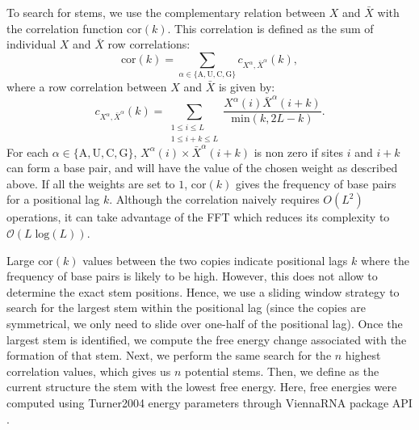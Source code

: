 To search for stems, we use the complementary relation between \(X\) and \(\bar{X}\) with the correlation function \(\text{cor}(k)\). This correlation is defined as the sum of individual \(X\) and \(\bar{X}\) row correlations:
\begin{equation}
\text{cor}(k)=\sum_{\alpha \in \{\text{A},\text{U},\text{C},\text{G}\}}c_{X^{\alpha},\bar{X}^{\alpha}}(k),
\end{equation}
where a row correlation between \(X\) and \(\bar{X}\) is given by:
\begin{equation}
c_{X^\alpha,\bar{X}^\alpha}(k) = \sum\limits_{\substack{1\leq i \leq L\\1 \leq i + k \leq L}} \frac{X^\alpha(i) \bar{X}^\alpha(i+k)}{\text{min}(k, 2 L-k)}.
\end{equation}
For each \(\alpha \in \{\text{A},\text{U},\text{C},\text{G}\}\), \(X^\alpha(i) \times \bar{X}^\alpha(i+k)\) is non zero if sites \(i\) and \(i+k\) can form a base pair, and will have the value of the chosen weight as described above. If all the weights are set to $1$, \(\text{cor}(k)\) gives the frequency of base pairs for a positional lag \(k\). Although the correlation naively requires \(O(L^2)\) operations, it can take advantage of the FFT which reduces its complexity to \(\mathcal{O}(L\;\text{log}(L))\).

Large \(\text{cor}(k)\) values between the two copies indicate positional lags \(k\) where the frequency of base pairs is likely to be high. However, this does not allow to determine the exact stem positions. Hence, we use a sliding window strategy to search for the largest stem within the positional lag (since the copies are symmetrical, we only need to slide over one-half of the positional lag). Once the largest stem is identified, we compute the free energy change associated with the formation of that stem. Next, we perform the same search for the \(n\) highest correlation values, which gives us \(n\) potential stems. Then, we define as the current structure the stem with the lowest free energy. Here, free energies were computed using Turner2004 energy parameters through ViennaRNA package API \cite{lorenz11_vienn_packag}.


